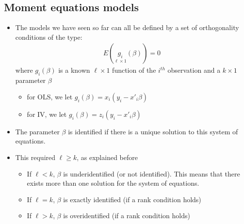 \documentclass[a4paper,twoside,11pt]{article}
\begin{document}
\subsection{Moment equations models}
\begin{itemize}
    \item The models we have seen so far can all be defined by a set of orthogonality conditions of the type:
\newline
\begin{equation*}
\begin{aligned}
E(\underset{\ell \times 1}{g_i} (\beta)) =0
\end{aligned} 
\end{equation*}
where $g_i(\beta)$ is a known $\ell \times 1$ function of the $i^{th}$ observation and a $k \times 1$ parameter $\beta$ 
\begin{itemize}
    \item for OLS, we let $g_i(\beta) = x_i(y_i - x'_i \beta)$
    \item for IV, we let $g_i(\beta) = z_i (y_i - x'_i \beta)$
\end{itemize}
    \item The parameter $\beta$ is identified if there is a unique solution to this system of equations.
    \item This required $\ell \ge k$, as explained before
    \begin{itemize}
        \item If $\ell <k$, $\beta$ is underidentified (or not identified). This means that there exists more than one solution for the system of equations.
        \item If $\ell =k$, $\beta$ is exactly identified (if a rank condition holds)
        \item If $\ell>k$, $\beta$ is overidentified (if a rank condition holds)
    \end{itemize}
\end{itemize}
\end{document}
